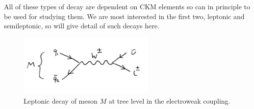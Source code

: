 All of these types of decay are dependent on CKM elements so can in principle to be used for studying them. We are most interested in the first two, leptonic and semileptonic, so will give detail of such decays here.

\begin{figure}
  \vspace{-10pt}
  \begin{center}
    \includegraphics[width=0.6\textwidth]{images/leptonicdecay.jpg}
  \end{center}
  \vspace{-20pt}
  \caption{Leptonic decay of meson $M$ at tree level in the electroweak coupling.}
  \label{fig:leptonicdecay}
\end{figure}

